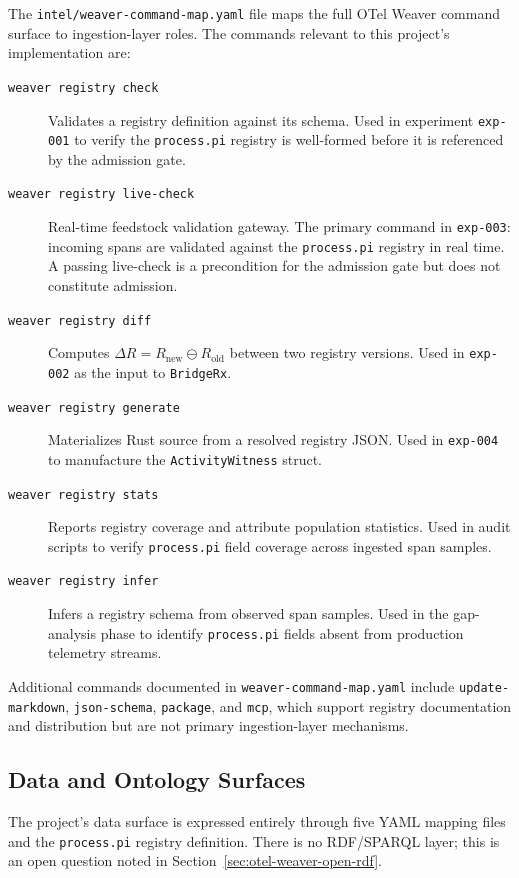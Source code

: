 The \texttt{intel/weaver-command-map.yaml} file maps the full OTel Weaver command surface to
ingestion-layer roles. The commands relevant to this project's implementation are:

\begin{description}
  \item[\texttt{weaver registry check}] Validates a registry definition against its schema.
    Used in experiment \texttt{exp-001} to verify the \texttt{process.pi} registry is
    well-formed before it is referenced by the admission gate.
  \item[\texttt{weaver registry live-check}] Real-time feedstock validation gateway. The
    primary command in \texttt{exp-003}: incoming spans are validated against the
    \texttt{process.pi} registry in real time. A passing live-check is a precondition for
    the admission gate but does not constitute admission.
  \item[\texttt{weaver registry diff}] Computes $\Delta R = R_{\text{new}} \ominus R_{\text{old}}$
    between two registry versions. Used in \texttt{exp-002} as the input to \texttt{BridgeRx}.
  \item[\texttt{weaver registry generate}] Materializes Rust source from a resolved registry
    JSON. Used in \texttt{exp-004} to manufacture the \texttt{ActivityWitness} struct.
  \item[\texttt{weaver registry stats}] Reports registry coverage and attribute population
    statistics. Used in audit scripts to verify \texttt{process.pi} field coverage across
    ingested span samples.
  \item[\texttt{weaver registry infer}] Infers a registry schema from observed span samples.
    Used in the gap-analysis phase to identify \texttt{process.pi} fields absent from
    production telemetry streams.
\end{description}

Additional commands documented in \texttt{weaver-command-map.yaml} include \texttt{update-markdown},
\texttt{json-schema}, \texttt{package}, and \texttt{mcp}, which support registry documentation
and distribution but are not primary ingestion-layer mechanisms.

\subsection{Data and Ontology Surfaces}
\label{sec:otel-weaver-impl-data}

The project's data surface is expressed entirely through five YAML mapping files and the
\texttt{process.pi} registry definition. There is no RDF/SPARQL layer; this is an open question
noted in Section~\ref{sec:otel-weaver-open-rdf}.

